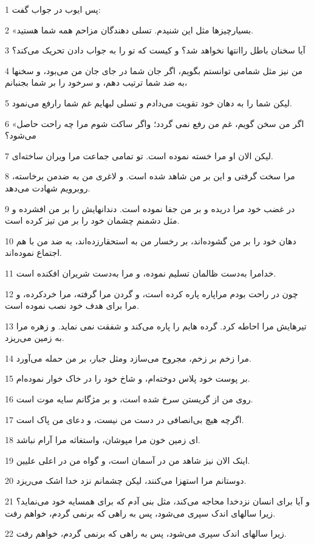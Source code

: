 \par 1 پس ایوب در جواب گفت:
\par 2 «بسیارچیزها مثل این شنیدم. تسلی دهندگان مزاحم همه شما هستید.
\par 3 آیا سخنان باطل راانتها نخواهد شد؟ و کیست که تو را به جواب دادن تحریک می‌کند؟
\par 4 من نیز مثل شمامی توانستم بگویم، اگر جان شما در جای جان من می‌بود، و سخنها به ضد شما ترتیب دهم، و سرخود را بر شما بجنبانم،
\par 5 لیکن شما را به دهان خود تقویت می‌دادم و تسلی لبهایم غم شما رارفع می‌نمود.
\par 6 «اگر من سخن گویم، غم من رفع نمی گردد؛ واگر ساکت شوم مرا چه راحت حاصل می‌شود؟
\par 7 لیکن الان او مرا خسته نموده است. تو تمامی جماعت مرا ویران ساخته‌ای.
\par 8 مرا سخت گرفتی و این بر من شاهد شده است. و لاغری من به ضدمن برخاسته، روبرویم شهادت می‌دهد.
\par 9 در غضب خود مرا دریده و بر من جفا نموده است. دندانهایش را بر من افشرده و مثل دشمنم چشمان خود را بر من تیز کرده است.
\par 10 دهان خود را بر من گشوده‌اند، بر رخسار من به استحقارزده‌اند، به ضد من با هم اجتماع نموده‌اند.
\par 11 خدامرا به‌دست ظالمان تسلیم نموده، و مرا به‌دست شریران افکنده است.
\par 12 چون در راحت بودم مراپاره پاره کرده است، و گردن مرا گرفته، مرا خردکرده، و مرا برای هدف خود نصب نموده است.
\par 13 تیرهایش مرا احاطه کرد. گرده هایم را پاره می‌کند و شفقت نمی نماید. و زهره مرا به زمین می‌ریزد.
\par 14 مرا زخم بر زخم، مجروح می‌سازد ومثل جبار، بر من حمله می‌آورد.
\par 15 بر پوست خود پلاس دوخته‌ام، و شاخ خود را در خاک خوار نموده‌ام.
\par 16 روی من از گریستن سرخ شده است، و بر مژگانم سایه موت است.
\par 17 اگر‌چه هیچ بی‌انصافی در دست من نیست، و دعای من پاک است.
\par 18 ‌ای زمین خون مرا مپوشان، واستغاثه مرا آرام نباشد.
\par 19 اینک الان نیز شاهد من در آسمان است، و گواه من در اعلی علیین.
\par 20 دوستانم مرا استهزا می‌کنند، لیکن چشمانم نزد خدا اشک می‌ریزد.
\par 21 و آیا برای انسان نزدخدا محاجه می‌کند، مثل بنی آدم که برای همسایه خود می‌نماید؟زیرا سالهای اندک سپری می‌شود، پس به راهی که برنمی گردم، خواهم رفت.
\par 22 زیرا سالهای اندک سپری می‌شود، پس به راهی که برنمی گردم، خواهم رفت.
 
